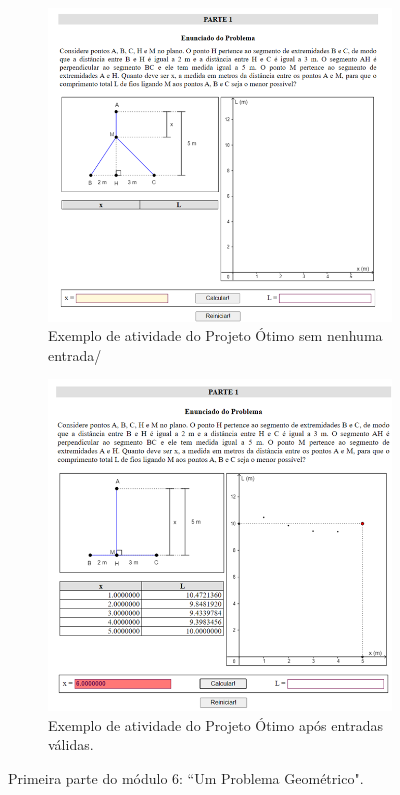 \begin{figure}[htb]
    \begin{subfigure}[b]{0.47\textwidth}
    \centering
    \includegraphics[width=\textwidth]{media/CDME-prob-geometrico-12.png}
    \caption{Exemplo de atividade do Projeto Ótimo sem nenhuma entrada/}
    \label{fig:otimo13-11}
    \end{subfigure}
    \hfill
    \begin{subfigure}[b]{0.47\textwidth}
    \includegraphics[width=\textwidth]{media/CDME-prob-geometrico-11.png}
    \caption{Exemplo de atividade do Projeto Ótimo após entradas válidas.}
    \label{fig:otimo13-12}
    \end{subfigure}
    \caption{Primeira parte do módulo 6: ``Um Problema Geométrico".}
    \label{fig:otimo13-1}
    
\end{figure}

